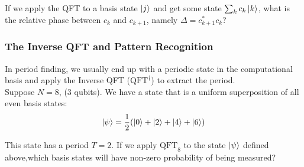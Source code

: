 If we apply the QFT to a basis state $\ket{j}$ and get some state $\sum_k c_k\ket{k}$, what is the relative phase between $c_k$ and $c_{k+1}$, namely $\Delta = c_{k+1}^*c_k$? 

\noindent{}




\subsubsection{The Inverse QFT and Pattern Recognition}
In period finding, we usually end up with a periodic state in the computational basis and apply the Inverse QFT ($\mathrm{QFT}^\dagger$) to extract the period. \\

Suppose $N=8$, ($3$ qubits). We have a state that is a uniform superposition of all even basis states:
\begin{equation}
    \ket{\psi} = \frac{1}{2} (\ket{0} + \ket{2} + \ket{4} + \ket{6})
\end{equation}

This state has a period $T = 2$. If we apply $\mathrm{QFT}_8$ to the state $\ket{\psi}$ defined above,which basis states will have non-zero probability of being measured? \\

